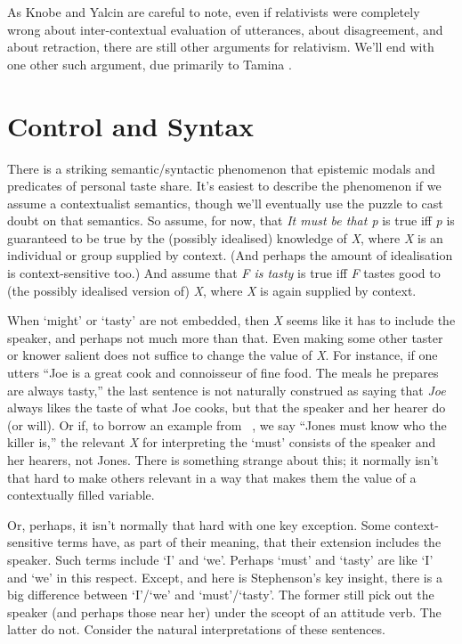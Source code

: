 As Knobe and Yalcin are careful to note, even if relativists were completely wrong about inter-contextual evaluation of utterances, about disagreement, and about retraction, there are still other arguments for relativism. We'll end with one other such argument, due primarily to Tamina  \citet{Stephenson2007}.

\section{Control and Syntax}
\label{controlandsyntax}

There is a striking semantic\slash syntactic phenomenon that epistemic modals and predicates of personal taste share. It's easiest to describe the phenomenon if we assume a contextualist semantics, though we'll eventually use the puzzle to cast doubt on that semantics. So assume, for now, that \emph{It must be that p} is true iff \emph{p} is guaranteed to be true by the (possibly idealised) knowledge of \emph{X}, where \emph{X} is an individual or group supplied by context. (And perhaps the amount of idealisation is context-sensitive too.) And assume that \emph{F is tasty} is true iff \emph{F} tastes good to (the possibly idealised version of) \emph{X}, where \emph{X} is again supplied by context.

When `might' or `tasty' are not embedded, then \emph{X} seems like it has to include the speaker, and perhaps not much more than that. Even making some other taster or knower salient does not suffice to change the value of \emph{X}. For instance, if one utters ``Joe is a great cook and connoisseur of fine food. The meals he prepares are always tasty,'' the last sentence is not naturally construed as saying that \emph{Joe} always likes the taste of what Joe cooks, but that the speaker and her hearer do (or will). Or if, to borrow an example from ~\citep{Weatherson2011-NoRoyal}, we say ``Jones must know who the killer is,'' the relevant \emph{X} for interpreting the `must' consists of the speaker and her hearers, not Jones. There is something strange about this; it normally isn't that hard to make others relevant in a way that makes them the value of a contextually filled variable.

Or, perhaps, it isn't normally that hard with one key exception. Some context-sensitive terms have, as part of their meaning, that their extension includes the speaker. Such terms include `I' and `we'. Perhaps `must' and `tasty' are like `I' and `we' in this respect. Except, and here is Stephenson's key insight, there is a big difference between `I'\slash `we' and `must'\slash `tasty'. The former still pick out the speaker (and perhaps those near her) under the sceopt of an attitude verb. The latter do not. Consider the natural interpretations of these sentences.


